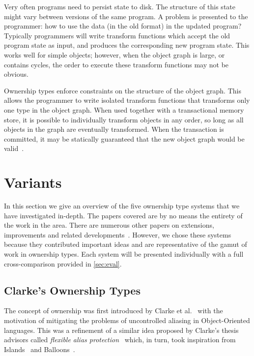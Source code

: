 \documentclass{acm_proc_article-sp}
\begin{document}
Very often programs need to persist state to disk. The structure of this state
might vary between versions of the same program. A problem is presented to the
programmer: how to use the data (in the old format) in the updated program?
Typically programmers will write transform functions which accept the old
program state as input, and produces the corresponding new program state. This
works well for simple objects; however, when the object graph is large, or
contains cycles, the order to execute these transform functions may not be
obvious.

Ownership types enforce constraints on the structure of the object graph. This
allows the programmer to write isolated transform functions that transforms only
one type in the object graph. When used together with a transactional memory
store, it is possible to individually transform objects in any order, so long as
all objects in the graph are eventually transformed. When the transaction is
committed, it may be statically guaranteed that the new object graph would be
valid~\cite{boyapati04safejava,boyapati03innerclass}.

\section{Variants}
\label{sec:variants}

In this section we give an overview of the five ownership type systems that we
have investigated in-depth. The papers covered are by no means the entirety of
the work in the area. There are numerous other papers on extensions,
improvements and related developments~\cite{clarke13survey}. However, we chose
these systems because they contributed important ideas and are
representative of the gamut of work in ownership types. Each system will be
presented individually with a full cross-comparison provided in \cref{sec:eval}.

\subsection{Clarke's Ownership Types}
\label{subsec:clarke}

The concept of ownership was first introduced by Clarke et
al.~\cite{clarke98ownership,clarke01ownership} with the motivation of
mitigating the problems of uncontrolled aliasing in Object-Oriented languages.
This was a refinement of a similar idea proposed by Clarke's thesis advisors
called \emph{flexible alias protection}~\cite{noble98alias} which, in turn,
took inspiration from Islands~\cite{hogg91islands} and
Balloons~\cite{almeida97balloons}.
\end{document}
